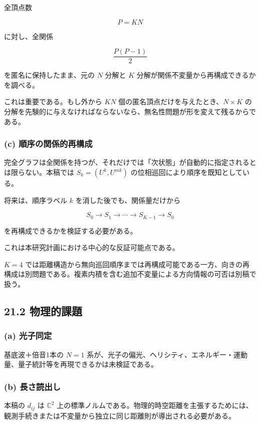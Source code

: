 \documentclass[
  a4paper,
]{ltjsarticle}
\begin{document}
全頂点数

\[
P=KN
\]

に対し、全関係

\[
\frac{P(P-1)}2
\]

を匿名に保持したまま、元の \(N\) 分解と \(K\)
分解が関係不変量から再構成できるかを調べる。

これは重要である。もし外から \(KN\)
個の匿名頂点だけを与えたとき、\(N\times K\)
の分解を先験的に与えなければならないなら、無名性問題が形を変えて残るからである。

\subsubsection{(c)
順序の関係的再構成}\label{c-ux9806ux5e8fux306eux95a2ux4fc2ux7684ux518dux69cbux6210}

完全グラフは全関係を持つが、それだけでは「次状態」が自動的に指定されるとは限らない。本稿では
\(S_k=(U^k,U^{mk})\) の位相巡回により順序を既知としている。

将来は、順序ラベル \(k\) を消した後でも、関係量だけから

\[
S_0\to S_1\to\cdots\to S_{K-1}\to S_0
\]

を再構成できるかを検証する必要がある。

これは本研究計画における中心的な反証可能点である。

\(K=4\)
では距離構造から無向巡回順序までは再構成可能である一方、向きの再構成は別問題である。複素内積を含む追加不変量による方向情報の可否は別稿で扱う。

\subsection{21.2 物理的課題}\label{ux7269ux7406ux7684ux8ab2ux984c}

\subsubsection{(a) 光子同定}\label{a-ux5149ux5b50ux540cux5b9a}

基底波＋倍音1本の \(N=1\)
系が、光子の偏光、ヘリシティ、エネルギー・運動量、量子統計等を再現できるかは未検証である。

\subsubsection{(b) 長さ読出し}\label{b-ux9577ux3055ux8aadux51faux3057}

本稿の \(d_{ij}\) は \(\mathbb C^2\)
上の標準ノルムである。物理的時空距離を主張するためには、観測手続きまたは不変量から独立に同じ距離則が導出される必要がある。
\end{document}
